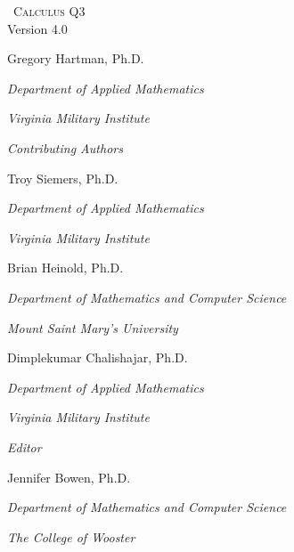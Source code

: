 
\hskip 125pt\begin{minipage}{\textwidth}
\begin{flushright}
\thispagestyle{empty}


\textsc{\large \apex\ {\Huge Calculus Q3}} \\

{\small Version 4.0}\\

\Large
\vspace{1in}

Gregory Hartman, Ph.D.

\emph{\small Department of Applied Mathematics}

\emph{\small Virginia Military Institute}\vskip15pt

\parbox{200pt}{\textit{Contributing Authors}}\hskip 2cm \phantom{.}

%
%

Troy Siemers, Ph.D. 

\emph{\small Department of Applied Mathematics}

\emph{\small Virginia Military Institute}\vskip 15pt

Brian Heinold, Ph.D.

\emph{\small Department of Mathematics and Computer Science}

\emph{\small Mount Saint Mary's University}\vskip 15pt

Dimplekumar Chalishajar, Ph.D.

\emph{\small Department of Applied Mathematics}

\emph{\small Virginia Military Institute}\vskip 25pt

\parbox{200pt}{\textit{Editor}}\hskip 2cm \phantom{.}

Jennifer Bowen, Ph.D.

\emph{\small Department of Mathematics and Computer Science}

\emph{\small The College of Wooster}

\normalsize
\end{flushright}
\end{minipage}

